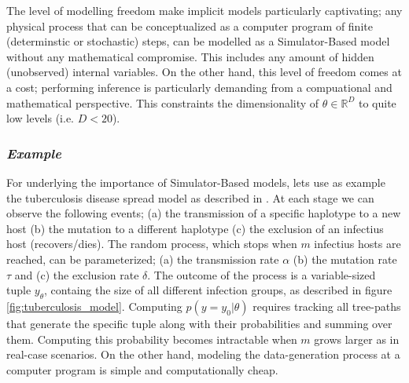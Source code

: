 \documentclass[11pt,twoside]{article}
\numberwithin{Theorem}{section}
\numberwithin{Definition}{section}
\numberwithin{Lemma}{section}
\numberwithin{Algorithm}{section}
\numberwithin{equation}{section}
\begin{document}
The level of modelling freedom make implicit models particularly captivating; any physical process that can be conceptualized as a computer program of finite (determinstic or stochastic) steps, can be modelled as a Simulator-Based model without any mathematical compromise. This includes any amount of hidden (unobserved) internal variables. On the other hand, this level of freedom comes at a cost; performing inference is particularly demanding from a compuational and mathematical perspective. This constraints the dimensionality of $\theta \in \mathbb{R}^D$ to quite low levels (i.e. $D<20$).

\subsubsection*{\textit{Example}}

For underlying the importance of Simulator-Based models, lets use as example the tuberculosis disease spread model as described in \cite{Tanaka2006}. At each stage we can observe the following events; (a) the transmission of a specific haplotype to a new host (b) the mutation to a different haplotype (c) the exclusion of an infectius host (recovers/dies). The random process, which stops when $m$ infectius hosts are reached, can be parameterized; (a) the transmission rate $\alpha$ (b) the mutation rate $\tau$ and (c) the exclusion rate $\delta$. The outcome of the process is a variable-sized tuple $y_\theta$, containg the size of all different infection groups, as described in figure \ref{fig:tuberculosis_model}. Computing $p(y=y_0|\theta)$ requires tracking all tree-paths that generate the specific tuple along with their probabilities and summing over them. Computing this probability becomes intractable when $m$ grows larger as in real-case scenarios. On the other hand, modeling the data-generation process at a computer program is simple and computationally cheap.
\end{document}
